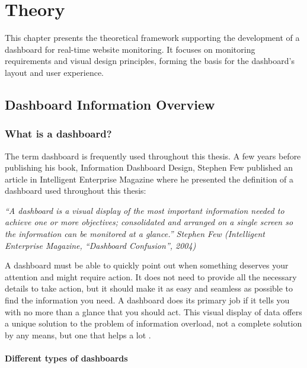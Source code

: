\chapter{Theory}
\label{ch:theory}

This chapter presents the theoretical framework supporting the development of a dashboard for real-time website monitoring. It focuses on monitoring requirements and visual design principles,  forming the basis for the dashboard's layout and user experience. 

\section{Dashboard Information Overview}
\label{dashboard_information_overview}


\subsection{What is a dashboard?}
\label{subsec:what_is_dashboard}

The term dashboard is frequently used throughout this thesis. A few years before publishing his book, Information Dashboard Design, Stephen Few published an article in Intelligent Enterprise Magazine where he presented the definition of a dashboard used throughout this thesis:

\textit{“A dashboard is a visual display of the most important information needed to achieve one or more objectives; consolidated and arranged on a single screen so the information can be monitored at a glance.” Stephen Few (Intelligent Enterprise Magazine, “Dashboard Confusion”, 2004)}

A dashboard must be able to quickly point out when something deserves your attention and might require action. It does not need to provide all the necessary details to take action, but it should make it as easy and seamless as possible to find the information you need. A dashboard does its primary job if it tells you with no more than a glance that you should act. This visual display of data offers a unique solution to the problem of information overload, not a complete solution by any means, but one that helps a lot \autocite[p. 28]{FewDashboard}.

\subsubsection{Different types of dashboards}
\label{subsubsec:different_types_dashboards}


